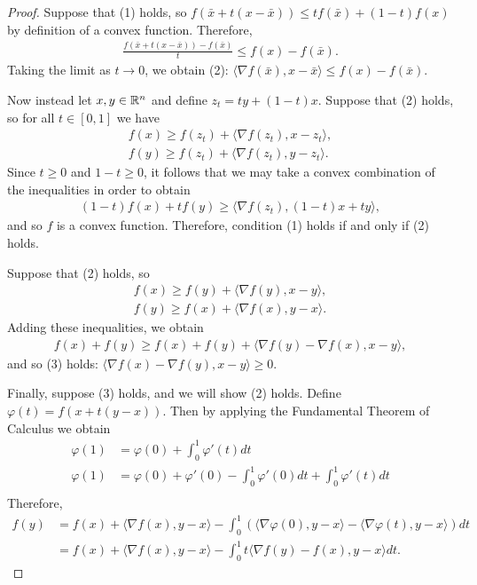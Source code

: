 \begin{proof}
    Suppose that (1) holds, so $f(\bar{x} + t(x - \bar{x})) \leq tf(\bar{x}) + (1 - t)f(x)$ by definition of a convex function. Therefore,
    \begin{align*}
        \frac{f(\bar{x} + t(x - \bar{x})) - f(\bar{x})}{t} \leq f(x) - f(\bar{x}).
    \end{align*}
    Taking the limit as $t \to 0$, we obtain (2): $\langle \nabla f(\bar{x}), x - \bar{x} \rangle \leq f(x) - f(\bar{x})$.

    Now instead let $x, y \in \mathbb{R}^n$ and define $z_t = ty + (1-t)x$. Suppose that (2) holds, so for all $t \in [0, 1]$ we have
    \begin{align*}
        f(x) \geq f(z_t) + \langle \nabla f(z_t), x - z_t\rangle, \\
        f(y) \geq f(z_t) + \langle \nabla f(z_t), y - z_t\rangle.
    \end{align*}
    Since $t \geq 0$ and $1-t \geq 0$, it follows that we may take a convex combination of the inequalities in order to obtain
    \begin{align*}
        (1-t)f(x) + tf(y) \geq \langle \nabla f(z_t), (1-t)x + ty \rangle,
    \end{align*}
    and so $f$ is a convex function. Therefore, condition (1) holds if and only if (2) holds.

    Suppose that (2) holds, so
    \begin{align*}
        f(x) \geq f(y) + \langle \nabla f(y), x - y\rangle, \\
        f(y) \geq f(x) + \langle \nabla f(x), y - x\rangle.
    \end{align*}
    Adding these inequalities, we obtain
    \begin{align*}
        f(x) + f(y) \geq f(x) + f(y) + \langle \nabla f(y) - \nabla f(x), x - y \rangle,
    \end{align*}
    and so (3) holds: $\langle \nabla f(x) - \nabla f(y), x - y \rangle \geq 0$.

    Finally, suppose (3) holds, and we will show (2) holds. Define $\varphi(t) = f(x + t(y - x))$. Then by applying the Fundamental Theorem of Calculus we obtain
    \begin{align*}
        \varphi(1) &= \varphi(0) + \int_{0}^{1}\varphi'(t)dt \\
        \varphi(1) &= \varphi(0) + \varphi'(0) - \int_{0}^{1} \varphi'(0)dt + \int_{0}^{1}\varphi'(t)dt \\
    \end{align*}
    Therefore,
    \begin{align*}
        f(y) &= f(x) + \langle \nabla f(x), y - x \rangle - \int_{0}^{1}\left(\langle \nabla \varphi(0), y - x \rangle - \langle \nabla \varphi(t), y - x \rangle\right) dt \\
        &= f(x) + \langle \nabla f(x), y - x \rangle - \int_{0}^{1}t\langle \nabla f(y) - f(x), y - x \rangle dt.
    \end{align*}
\end{proof}

